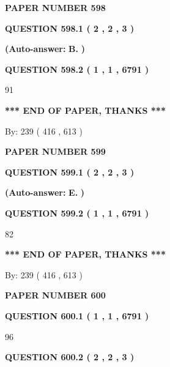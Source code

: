 \documentclass{ctexart}
\begin{document}
   
\newpage 
\setcounter{page}{ 
   598001 } 
   
   
 {\textbf{ \Large{ PAPER NUMBER  598  }}}
   
   
   
   
  
  
{\textbf{\large{QUESTION
598.1 
 ( 2 , 2 , 3 )
}}}
 
 
{\textbf{(Auto-answer:}}
{\textbf{\large{
B.}}}
{\textbf{)}}
 
 
  
  
{\textbf{\large{QUESTION
598.2 
 ( 1 , 1 , 6791 )
}}}

91
   
   
   
   
\vspace{1.0in} 
{\textbf{\large{ *** END OF PAPER, THANKS *** }}} 
   
   
\hspace{1.0in} By: 
 239 ( 416 ,  613 )
   
   
   
   
\newpage 
\setcounter{page}{ 
   599001 } 
   
   
 {\textbf{ \Large{ PAPER NUMBER  599  }}}
   
   
   
   
  
  
{\textbf{\large{QUESTION
599.1 
 ( 2 , 2 , 3 )
}}}
 
 
{\textbf{(Auto-answer:}}
{\textbf{\large{
E.}}}
{\textbf{)}}
 
 
  
  
{\textbf{\large{QUESTION
599.2 
 ( 1 , 1 , 6791 )
}}}

82
   
   
   
   
\vspace{1.0in} 
{\textbf{\large{ *** END OF PAPER, THANKS *** }}} 
   
   
\hspace{1.0in} By: 
 239 ( 416 ,  613 )
   
   
   
   
\newpage 
\setcounter{page}{ 
   600001 } 
   
   
 {\textbf{ \Large{ PAPER NUMBER  600  }}}
   
   
   
   
  
  
{\textbf{\large{QUESTION
600.1 
 ( 1 , 1 , 6791 )
}}}

96
  
  
{\textbf{\large{QUESTION
600.2 
 ( 2 , 2 , 3 )
}}}
 
\end{document}

